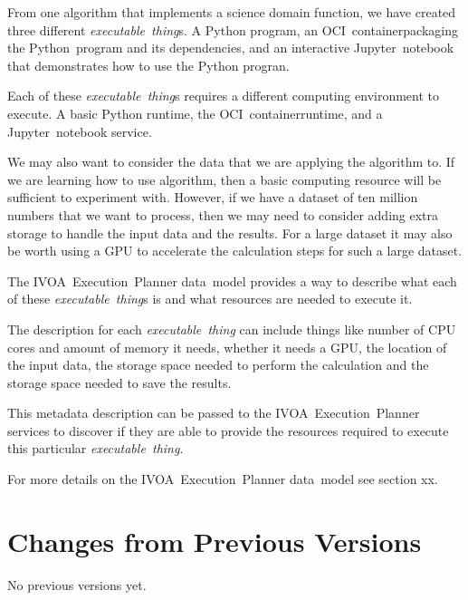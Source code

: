 \documentclass[11pt,a4paper]{ivoa}
\newcommand{\datamodel} {data~model\xspace}
\newcommand{\ivoaexecplanner} {IVOA~Execution~Planner\xspace}
\newcommand{\jupyternotebook} {Jupyter~notebook\xspace}
\newcommand{\python} {Python\xspace}
\newcommand{\pythonprogram} {Python~program\xspace}
\newcommand{\ocicontainer} {OCI~container}
\newcommand{\dataset} {dataset\xspace}
\newcommand{\executablething}  {\textit{executable~thing}\xspace}
\newcommand{\cpu} {CPU\xspace}
\newcommand{\gpu} {GPU\xspace}
\begin{document}
From one algorithm that implements a science domain function, we have created three different \executablething{}s.
A \python program, an \ocicontainer packaging the \pythonprogram and its dependencies, and an interactive \jupyternotebook
that demonstrates how to use the \python progran.

Each of these \executablething{}s requires a different computing environment to execute.
A basic \python runtime, the \ocicontainer runtime, and a \jupyternotebook service.

We may also want to consider the data that we are applying the algorithm to.
If we are learning how to use algorithm, then a basic computing resource will be sufficient
to experiment with.
However, if we have a \dataset of ten million numbers that we want to process, then we may
need to consider adding extra storage to handle the input data and the results.
For a large \dataset it may also be worth using a \gpu to accelerate the calculation steps
for such a large \dataset.

The \ivoaexecplanner \datamodel provides a way to describe what each of these \executablething{}s
is and what resources are needed to execute it.

The description for each \executablething can include things like number of \cpu cores and
amount of memory it needs, whether it needs a \gpu, the location of the input data,
the storage space needed to perform the calculation and the storage space needed to save the results.

This metadata description can be passed to the \ivoaexecplanner services to discover if they
are able to provide the resources required to execute this particular \executablething.

For more details on the \ivoaexecplanner \datamodel see section xx.

\appendix
\section{Changes from Previous Versions}

No previous versions yet.



\end{document}
